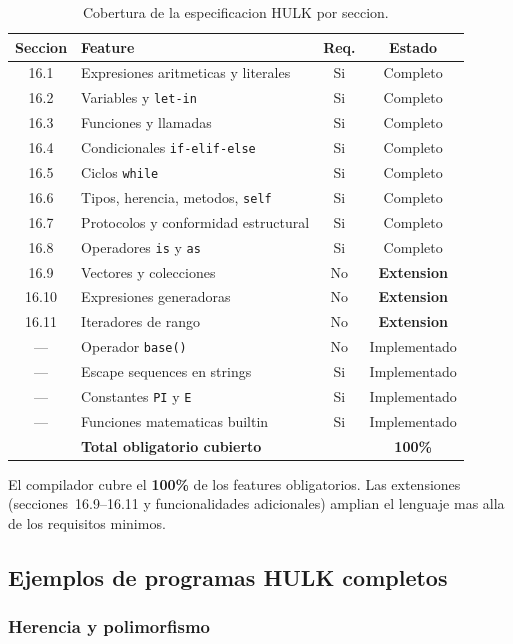 \documentclass[12pt,a4paper]{article}
\begin{document}
\begin{table}[H]
\centering
\begin{tabular}{clcc}
\toprule
\textbf{Seccion} & \textbf{Feature} & \textbf{Req.} & \textbf{Estado} \\
\midrule
16.1 & Expresiones aritmeticas y literales & Si & Completo \\
16.2 & Variables y \texttt{let-in} & Si & Completo \\
16.3 & Funciones y llamadas & Si & Completo \\
16.4 & Condicionales \texttt{if-elif-else} & Si & Completo \\
16.5 & Ciclos \texttt{while} & Si & Completo \\
16.6 & Tipos, herencia, metodos, \texttt{self} & Si & Completo \\
16.7 & Protocolos y conformidad estructural & Si & Completo \\
16.8 & Operadores \texttt{is} y \texttt{as} & Si & Completo \\
16.9 & Vectores y colecciones & No & \textbf{Extension} \\
16.10 & Expresiones generadoras & No & \textbf{Extension} \\
16.11 & Iteradores de rango & No & \textbf{Extension} \\
--- & Operador \texttt{base()} & No & Implementado \\
--- & Escape sequences en strings & Si & Implementado \\
--- & Constantes \texttt{PI} y \texttt{E} & Si & Implementado \\
--- & Funciones matematicas builtin & Si & Implementado \\
\midrule
& \textbf{Total obligatorio cubierto} & & \textbf{100\%} \\
\bottomrule
\end{tabular}
\caption{Cobertura de la especificacion HULK por seccion.}
\end{table}

El compilador cubre el \textbf{100\%} de los features obligatorios. Las extensiones
(secciones~16.9--16.11 y funcionalidades adicionales) amplian el lenguaje mas alla
de los requisitos minimos.

\subsection{Ejemplos de programas HULK completos}

\subsubsection{Herencia y polimorfismo}
\end{document}
